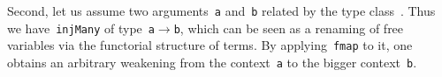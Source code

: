 \documentclass[9pt,preprint,authoryear]{sigplanconf}
\begin{document}
%
Second, let us assume two arguments{~}\textcolor[rgb]{0,0,0.80}{\texttt{a}} and{~}\textcolor[rgb]{0,0,0.80}{\texttt{b}} related by the
    type class{~}\textcolor[rgb]{0,0,0.80}{\texttt{\makebox[1.83ex][c]{$ \subseteq $}}}. Thus we have{~}\textcolor[rgb]{0,0,0.80}{\texttt{injMany}} of type{~}\textcolor[rgb]{0,0,0.80}{\texttt{a}}\textcolor[rgb]{0,0,0.80}{\texttt{\mbox{\hspace{0.50em}}}}\textcolor[cmyk]{0,0.65,0.99,0}{\texttt{$ \rightarrow $}}\textcolor[rgb]{0,0,0.80}{\texttt{\mbox{\hspace{0.50em}}}}\textcolor[rgb]{0,0,0.80}{\texttt{b}}, which
    can be seen as a renaming of free variables via the functorial
    structure of terms. By applying{~}\textcolor[rgb]{0,0,0.80}{\texttt{fmap}} to it, one obtains
    an arbitrary weakening from the context{~}\textcolor[rgb]{0,0,0.80}{\texttt{a}} to the bigger
    context{~}\textcolor[rgb]{0,0,0.80}{\texttt{b}}.%


{\nopagebreak }
\end{document}
